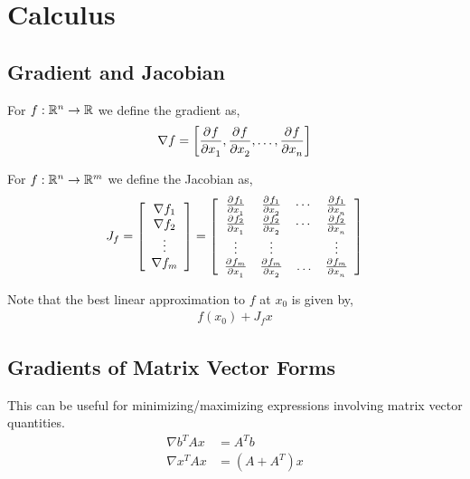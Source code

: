 \documentclass[12pt]{article}
\begin{document}
\maketitle

\pagebreak
\tableofcontents


\pagebreak
\section{Calculus}

\subsection{Gradient and Jacobian}
For \( f:\mathbb{R}^n\to\mathbb{R} \) we define the gradient as,
\begin{align*}
    \nabla f = \left[ \frac{\partial^{}f}{\partial x_1^{}}, \frac{\partial^{}f}{\partial x_2^{}}, \ldots, \frac{\partial^{}f}{\partial x_n^{}} \right]
\end{align*}

For \( f:\mathbb{R}^n\to\mathbb{R}^m \) we define the Jacobian as,
\begin{align*}
    J_f = \left[\begin{array}{c}
        \nabla f_1 \\ \nabla f_2 \\ \vdots \\ \nabla f_m
    \end{array}\right]
    =
    \left[\begin{array}{cccc}
        \frac{\partial^{}f_1}{\partial x_1^{}} & \frac{\partial^{}f_1}{\partial x_2^{}} & \cdots &\frac{\partial^{}f_1}{\partial x_n^{}} \\
        \frac{\partial^{}f_2}{\partial x_1^{}} & \frac{\partial^{}f_2}{\partial x_2^{}} & \cdots &\frac{\partial^{}f_2}{\partial x_n^{}} \\
        \vdots & \vdots & & \vdots\\
         \frac{\partial^{}f_m}{\partial x_1^{}} & \frac{\partial^{}f_m}{\partial x_2^{}} &\ldots & \frac{\partial^{}f_m}{\partial x_n^{}}
    \end{array}\right]
\end{align*}

Note that the best linear approximation to \( f \) at \( x_0 \) is given by,
\begin{align*}
    f(x_0) + J_f x
\end{align*}


\subsection{Gradients of Matrix Vector Forms}
This can be useful for minimizing/maximizing expressions involving matrix vector quantities.
\begin{align*}
    \nabla b^TAx &= A^Tb \\
    \nabla x^TAx &= (A+A^T)x
\end{align*}
\end{document}
